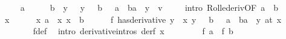 \begin{isabellebody}
\ \ \isamarkupfalse%
\ {\isachardoublequoteopen}{\isasymexists}{\isasymxi}{\isachardot}{\kern0pt}\ a\ {\isacharless}{\kern0pt}\ {\isasymxi}\ {\isasymand}\ {\isasymxi}\ {\isacharless}{\kern0pt}\ b\ {\isasymand}\ {\isacharparenleft}{\kern0pt}{\isasymlambda}y{\isachardot}{\kern0pt}\ {\isasymphi}{\isacharprime}{\kern0pt}\ {\isasymxi}\ y\ {\isacharminus}{\kern0pt}\ {\isacharparenleft}{\kern0pt}{\isasymphi}\ b\ {\isacharminus}{\kern0pt}\ {\isasymphi}\ a{\isacharparenright}{\kern0pt}\ {\isacharslash}{\kern0pt}\ {\isacharparenleft}{\kern0pt}b{\isacharminus}{\kern0pt}a{\isacharparenright}{\kern0pt}\ {\isacharasterisk}{\kern0pt}\ y{\isacharparenright}{\kern0pt}\ {\isacharequal}{\kern0pt}\ {\isacharparenleft}{\kern0pt}{\isasymlambda}v{\isachardot}{\kern0pt}\ {}{\isacharparenright}{\kern0pt}{\isachardoublequoteclose}\isanewline
\ \ \isamarkupfalse%
\ {\isacharparenleft}{\kern0pt}intro\ Rolle{\isacharunderscore}{\kern0pt}deriv{\isacharbrackleft}{\kern0pt}OF\ {\isacartoucheopen}a\ {\isacharless}{\kern0pt}\ b{\isacartoucheclose}{\isacharbrackright}{\kern0pt}{\isacharparenright}{\kern0pt}\isanewline
\ \ \ \ \isamarkupfalse%
\ x\isanewline
\ \ \ \ \isamarkupfalse%
\ x{\isacharcolon}{\kern0pt}\ {\isachardoublequoteopen}a\ {\isacharless}{\kern0pt}\ x{\isachardoublequoteclose}\ {\isachardoublequoteopen}x\ {\isacharless}{\kern0pt}\ b{\isachardoublequoteclose}\isanewline
\ \ \ \ \isamarkupfalse%
\ {\isachardoublequoteopen}{\isacharparenleft}{\kern0pt}f\ has{\isacharunderscore}{\kern0pt}derivative\ {\isacharparenleft}{\kern0pt}{\isasymlambda}y{\isachardot}{\kern0pt}\ {\isasymphi}{\isacharprime}{\kern0pt}\ x\ y\ {\isacharminus}{\kern0pt}\ {\isacharparenleft}{\kern0pt}{\isasymphi}\ b\ {\isacharminus}{\kern0pt}\ {\isasymphi}\ a{\isacharparenright}{\kern0pt}\ {\isacharslash}{\kern0pt}\ {\isacharparenleft}{\kern0pt}b{\isacharminus}{\kern0pt}a{\isacharparenright}{\kern0pt}\ {\isacharasterisk}{\kern0pt}\ y{\isacharparenright}{\kern0pt}{\isacharparenright}{\kern0pt}\ {\isacharparenleft}{\kern0pt}at\ x{\isacharparenright}{\kern0pt}{\isachardoublequoteclose}\isanewline
\ \ \ \ \ \ \isamarkupfalse%
\ f{\isacharunderscore}{\kern0pt}def\ \isamarkupfalse%
\ {\isacharparenleft}{\kern0pt}intro\ derivative{\isacharunderscore}{\kern0pt}intros\ derf\ x{\isacharparenright}{\kern0pt}\isanewline
\ \ \isamarkupfalse%
\isanewline
\ \ \ \ \isamarkupfalse%
\ {\isachardoublequoteopen}f\ a\ {\isacharequal}{\kern0pt}\ f\ b{\isachardoublequoteclose}\isanewline

\end{isabellebody}
